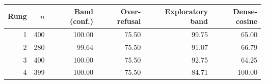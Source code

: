 \begin{tabular}{rrrrrr}
\hline
Rung & $n$ & Band (conf.) & Over-refusal & Exploratory band & Dense-cosine \\
\hline
1 & 400 & 100.00 & 75.50 & 99.75 & 65.00 \\
2 & 280 & 99.64 & 75.50 & 91.07 & 66.79 \\
3 & 400 & 100.00 & 75.50 & 92.75 & 64.25 \\
4 & 399 & 100.00 & 75.50 & 84.71 & 100.00 \\
\hline
\end{tabular}
